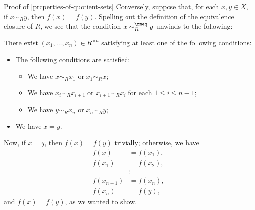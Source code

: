 \begin{Proof}{Proof of \cref{properties-of-quotient-sets}}
    Conversely, suppose that, for each $x,y\in X$, if $x\sim_{R}y$, then $f(x)=f(y)$. Spelling out the definition of the equivalence closure of $R$, we see that the condition $x\sim^{\rmeq}_{R}y$ unwinds to the following:
    \begin{itemize}
        \itemstar There exist $(x_{1},\ldots,x_{n})\in R^{\times n}$ satisfying at least one of the following conditions:%
            \begin{itemize}%
                \item The following conditions are satisfied:
                    \begin{itemize}
                        \item We have $x\sim_{R}x_{1}$       or $x_{1}\sim_{R}x$;
                        \item We have $x_{i}\sim_{R}x_{i+1}$ or $x_{i+1}\sim_{R}x_{i}$ for each $1\leq i\leq n-1$;
                        \item We have $y\sim_{R}x_{n}$       or $x_{n}\sim_{R}y$;
                    \end{itemize}
                \item We have $x=y$.%
            \end{itemize}%
    \end{itemize}
    Now, if $x=y$, then $f(x)=f(y)$ trivially; otherwise, we have
    \begin{align*}
        f(x)       &= f(x_{1}),\\
        f(x_{1})   &= f(x_{2}),\\
                   &\vdots     \\
        f(x_{n-1}) &= f(x_{n}),\\
        f(x_{n})   &= f(y),
    \end{align*}
    and $f(x)=f(y)$, as we wanted to show.
\end{Proof}
\begin{appendices}

\end{appendices}

